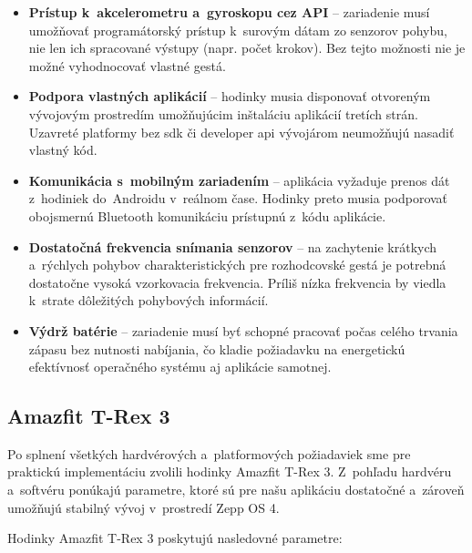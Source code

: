 \begin{itemize}
  \item \textbf{Prístup k~akcelerometru a~gyroskopu
        cez API} -- zariadenie musí umožňovať
        programátorský prístup k~surovým dátam
        zo senzorov pohybu, nie len ich spracované
        výstupy (napr. počet krokov). Bez tejto možnosti
        nie je možné vyhodnocovať vlastné gestá.

  \item \textbf{Podpora vlastných aplikácií} -- hodinky
        musia disponovať otvoreným vývojovým prostredím
        umožňujúcim inštaláciu aplikácií tretích strán.
        Uzavreté platformy bez \Gls{sdk} či developer
        \Gls{api} vývojárom neumožňujú nasadiť vlastný
        kód.

  \item \textbf{Komunikácia s~mobilným zariadením} --
        aplikácia vyžaduje prenos dát z~hodiniek
        do~Androidu v~reálnom čase. Hodinky preto musia
        podporovať obojsmernú Bluetooth komunikáciu
        prístupnú z~kódu aplikácie.

  \item \textbf{Dostatočná frekvencia snímania senzorov} --
        na zachytenie krátkych a~rýchlych pohybov
        charakteristických pre rozhodcovské gestá je
        potrebná dostatočne vysoká vzorkovacia frekvencia.
        Príliš nízka frekvencia by viedla k~strate
        dôležitých pohybových informácií.

  \item \textbf{Výdrž batérie} -- zariadenie musí byť
        schopné pracovať počas celého trvania zápasu
        bez nutnosti nabíjania, čo kladie požiadavku
        na energetickú efektívnosť operačného systému
        aj aplikácie samotnej.
\end{itemize}

\subsection{Amazfit T-Rex 3}

Po splnení všetkých hardvérových a~platformových
požiadaviek sme pre praktickú implementáciu zvolili
hodinky Amazfit T-Rex 3. Z~pohľadu hardvéru a~softvéru
ponúkajú parametre, ktoré sú pre našu aplikáciu
dostatočné a~zároveň umožňujú stabilný vývoj
v~prostredí Zepp OS 4.

Hodinky Amazfit T-Rex 3 \cite{trex3_specs}
poskytujú nasledovné parametre:

